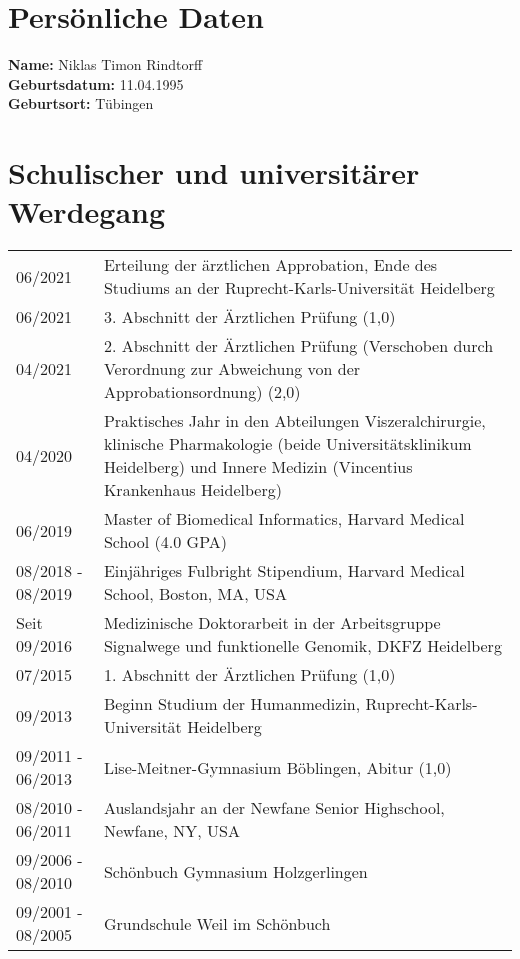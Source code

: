 

\pagestyle{empty}
\begin{flushleft}

\section*{Persönliche Daten}

\textbf{Name:} Niklas Timon Rindtorff \\
\textbf{Geburtsdatum:} 11.04.1995 \\
\textbf{Geburtsort:} Tübingen \\


\section*{Schulischer und universitärer Werdegang}

\noindent
\begin{tabularx}{\textwidth}{@{}lX@{}}
06/2021 & Erteilung der ärztlichen Approbation, Ende des Studiums an der Ruprecht-Karls-Universität Heidelberg \\
06/2021 & 3. Abschnitt der Ärztlichen Prüfung (1,0) \\
04/2021 & 2. Abschnitt der Ärztlichen Prüfung (Verschoben durch Verordnung zur Abweichung von der Approbationsordnung) (2,0) \\
04/2020 & Praktisches Jahr in den Abteilungen Viszeralchirurgie, klinische Pharmakologie (beide Universitätsklinikum Heidelberg) und Innere Medizin (Vincentius Krankenhaus Heidelberg) \\
06/2019 & Master of Biomedical Informatics, Harvard Medical School (4.0 GPA) \\
08/2018 - 08/2019 & Einjähriges Fulbright Stipendium, Harvard Medical School, Boston, MA, USA \\
Seit 09/2016 & Medizinische Doktorarbeit in der Arbeitsgruppe Signalwege und funktionelle Genomik, DKFZ Heidelberg \\
07/2015 & 1. Abschnitt der Ärztlichen Prüfung (1,0)  \\
09/2013 & Beginn Studium der Humanmedizin, Ruprecht-Karls-Universität Heidelberg \\
09/2011 - 06/2013 & Lise-Meitner-Gymnasium Böblingen, Abitur (1,0) \\
08/2010 - 06/2011 & Auslandsjahr an der Newfane Senior Highschool, Newfane, NY, USA \\
09/2006 - 08/2010 & Schönbuch Gymnasium Holzgerlingen \\
09/2001 - 08/2005 & Grundschule Weil im Schönbuch \\
\end{tabularx}

\end{flushleft}

